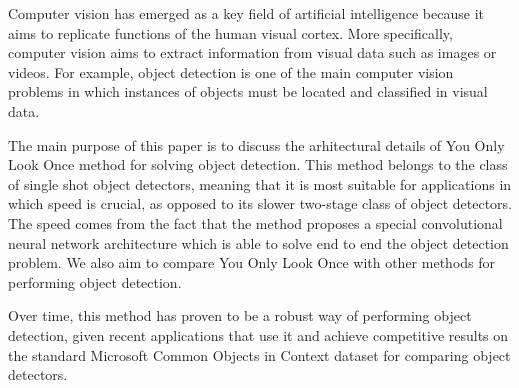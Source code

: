 
Computer vision has emerged as a key field of artificial intelligence because it aims to replicate functions of the human visual cortex. More specifically, computer vision aims to extract information from visual data such as images or videos. For example, object detection is one of the main computer vision problems in which instances of objects must be located and classified in  visual data.

The main purpose of this paper is to discuss the arhitectural details of You Only Look Once method for solving object detection. This method belongs to the class of single shot object detectors, meaning that it is most suitable for applications in which speed is crucial, as opposed to its slower two-stage class of object detectors. The speed comes from the fact that the method proposes a special convolutional neural network architecture which is able to solve end to end the object detection problem. We also aim to compare You Only Look Once with other methods for performing object detection.

Over time, this method has proven to be a robust way of performing object detection, given recent applications that use it and achieve competitive results on the standard Microsoft Common Objects in Context dataset for comparing object detectors.
